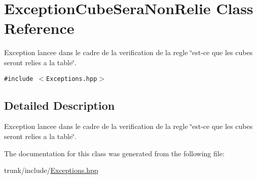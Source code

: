 \hypertarget{classExceptionCubeSeraNonRelie}{
\section{ExceptionCubeSeraNonRelie Class Reference}
\label{classExceptionCubeSeraNonRelie}
}
Exception lancee dans le cadre de la verification de la regle \char`\"{}est-ce que les cubes seront relies a la table\char`\"{}.  


{\tt \#include $<$Exceptions.hpp$>$}



\subsection{Detailed Description}
Exception lancee dans le cadre de la verification de la regle \char`\"{}est-ce que les cubes seront relies a la table\char`\"{}. 

The documentation for this class was generated from the following file:\begin{CompactItemize}
\item 
trunk/include/\hyperlink{Exceptions_8hpp}{Exceptions.hpp}\end{CompactItemize}
